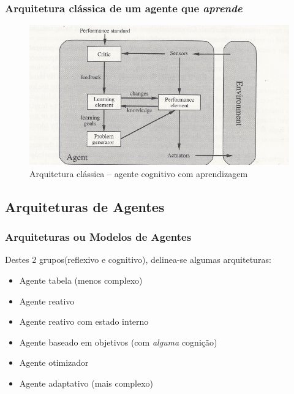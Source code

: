 \begin{frame}

  \frametitle{Arquitetura clássica de um agente que \textit{aprende}}
    
\begin{figure}[!ht]
\centering
\includegraphics[height =.6\textheight,width=.7\textwidth]{figuras/agente_aprendizagem.pdf}
\caption{Arquitetura clássica -- agente cognitivo com aprendizagem}
\label{ag_02}
\end{figure}
    
\end{frame}



\subsection{Arquiteturas de Agentes}
\begin{frame} %

\frametitle{Arquiteturas ou Modelos de Agentes}

\begin{block}{Destes 2 grupos(reflexivo e cognitivo), delinea-se algumas arquiteturas:}
  
    \begin{itemize}
      \item Agente tabela (menos complexo)
      \item Agente reativo
      \item Agente reativo com estado interno 
      \item Agente baseado em objetivos (com \textit{alguma} cognição)
      \item Agente otimizador
      \item Agente adaptativo (mais complexo)
    \end{itemize}
  
\end{block}

\end{frame}


